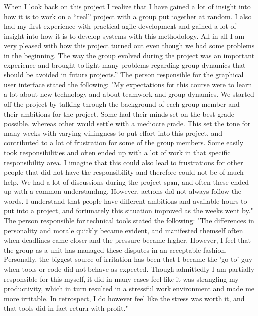 When I look back on this project I realize that I have gained a lot of insight into how it is to work on a “real” project with a group put together at random. I also had my first experience with practical agile development and gained a lot of insight into how it is to develop systems with this methodology. All in all I am very pleased with how this project turned out even though we had some problems in the beginning. The way the group evolved during the project was an important experience and brought to light many problems regarding group dynamics that should be avoided in future projects.''
\newline
\newline
The person responsible for the graphical user interface stated the following:
\newline
\newline
"My expectations for this course were to learn a lot about new technology and about teamwork and group dynamics. We started off the project by talking through the background of each group member and their ambitions for the project. Some had their minds set on the best grade possible, whereas other would settle with a mediocre grade. This set the tone for many weeks with varying willingness to put effort into this project, and contributed to a lot of frustration for some of the group members. Some easily took responsibilities and often ended up with a lot of work in that specific responsibility area. I imagine that this could also lead to frustrations for other people that did not have the responsibility and therefore could not be of much help. We had a lot of discussions during the project span, and often these ended up with a common understanding. However, actions did not always follow the words. I understand that people have different ambitions and available hours to put into a project, and fortunately this situation improved as the weeks went by." 
\newline
\newline
The person responsible for technical tools stated the following:
\newline
\newline
"The differences in personality and morale quickly became evident, and manifested themself often when deadlines came closer and the pressure became higher. However, I feel that the group as a unit has managed these disputes in an acceptable fashion. Personally, the biggest source of irritation has been that I became the 'go to'-guy when tools or code did not behave as expected. Though admittedly I am partially responsible for this myself, it did in many cases feel like it was strangling my productivity, which in turn resulted in a stressful work environment and made me more irritable. In retrospect, I do however feel like the stress was worth it, and that tools did in fact return with profit."

